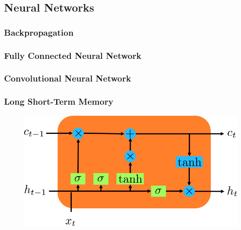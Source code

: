 \subsection{Neural Networks}
\label{sec::321_nn}
\subsubsection{Backpropagation}
\subsubsection{Fully Connected Neural Network}
\subsubsection{Convolutional Neural Network}
\subsubsection{Long Short-Term Memory}
\begin{figure}[h]
	\centering
	\includegraphics[scale=.5]{chapters/03_background/img/lstm.png}
	\caption{}
	\label{fig::321_lstm}
\end{figure}

